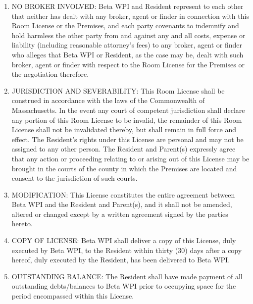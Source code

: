 \documentclass[legalpaper, 12pt]{article}
\begin{document}
\begin{enumerate}
        \item\label{itm:broker} NO BROKER INVOLVED\@: Beta WPI and Resident
                represent to each other that neither has dealt with any broker,
                agent or finder in connection with this Room License or the
                Premises, and each party covenants to indemnify and hold
                harmless the other party from and against any and all costs,
                expense or liability (including reasonable attorney’s fees) to
                any broker, agent or finder who alleges that Beta WPI or
                Resident, as the case may be, dealt with such broker, agent or
                finder with respect to the Room License for the Premises or the
                negotiation therefore.
        
        \item\label{itm:jurisdiction} JURISDICTION AND SEVERABILITY\@: This
                Room License shall be construed in accordance with the laws of
                the Commonwealth of Massachusetts.  In the event any court of
                competent jurisdiction shall declare any portion of this Room
                License to be invalid, the remainder of this Room License shall
                not be invalidated thereby, but shall remain in full force and
                effect.  The Resident’s rights under this License are personal
                and may not be assigned to any other person.  The Resident and
                Parent(s) expressly agree that any action or proceeding
                relating to or arising out of this License may be brought in
                the courts of the county in which the Premises are located and
                consent to the jurisdiction of such courts.

        \item\label{itm:mods} MODIFICATION\@: This License constitutes the
                entire agreement between Beta WPI and the Resident and
                Parent(s), and it shall not be amended, altered or changed
                except by a written agreement signed by the parties hereto.
        
        \item\label{itm:copy} COPY OF LICENSE\@: Beta WPI shall deliver a copy
                of this License, duly executed by Beta WPI, to the Resident
                within thirty (30) days after a copy hereof, duly executed by
                the Resident, has been delivered to Beta WPI\@.

        \item\label{itm:balance} OUTSTANDING BALANCE\@: The Resident shall have
                made payment of all outstanding debts/balances to Beta WPI
                prior to occupying space for the period encompassed within this
                License.


\end{enumerate}
\end{document}
